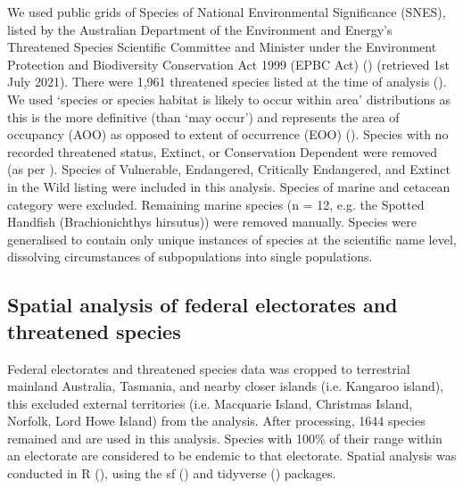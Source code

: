 \documentclass[a4paper,11pt]{article}
\begin{document}
We used public grids of Species of National Environmental Significance (SNES), listed by the Australian Department of the Environment and Energy’s Threatened Species Scientific Committee and Minister under the Environment Protection and Biodiversity Conservation Act 1999 (EPBC Act) (\cite{commonwealthofaustraliaThreatenedSpeciesEPBC2021}) (retrieved 1st July 2021). There were 1,961 threatened species listed at the time of analysis (\cite{commonwealthofaustraliaThreatenedSpeciesEPBC2021}). We used ‘species or species habitat is likely to occur within area’ distributions as this is the more definitive (than ‘may occur’) and represents the area of occupancy (AOO) as opposed to extent of occurrence (EOO) (\cite{gastonSizesSpeciesGeographic2009, lloydEstimatingSpatialCoverage2020}). Species with no recorded threatened status, Extinct, or Conservation Dependent were removed (as per \cite{wardNationalscaleDatasetThreats}). Species of Vulnerable, Endangered, Critically Endangered, and Extinct in the Wild listing were included in this analysis. Species of marine and cetacean category were excluded. Remaining marine species (n = 12, e.g. the Spotted Handfish (Brachionichthys hirsutus)) were removed manually. Species were generalised to contain only unique instances of species at the scientific name level, dissolving circumstances of subpopulations into single populations.

\subsection{Spatial analysis of federal electorates and threatened species}

Federal electorates and threatened species data was cropped to terrestrial mainland Australia, Tasmania, and nearby closer islands (i.e. Kangaroo island), this excluded external territories (i.e. Macquarie Island, Christmas Island, Norfolk, Lord Howe Island) from the analysis. After processing, 1644 species remained and are used in this analysis. Species with 100\% of their range within an electorate are considered to be endemic to that electorate. Spatial analysis was conducted in R (\cite{rcoreteamLanguageEnvironmentStatistical2021}), using the sf (\cite{pebesmaSimpleFeaturesStandardized2018}) and tidyverse (\cite{wickhamWelcomeTidyverse2019}) packages.

\end{document}
